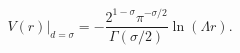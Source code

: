 \begin{equation}
\label{logpot}
V(r)|_{d=\sigma}=-\frac{2^{1-\sigma}\pi^{-\sigma/2}}{\Gamma(\sigma/2)}
\ln(\Lambda r).
\end{equation}


